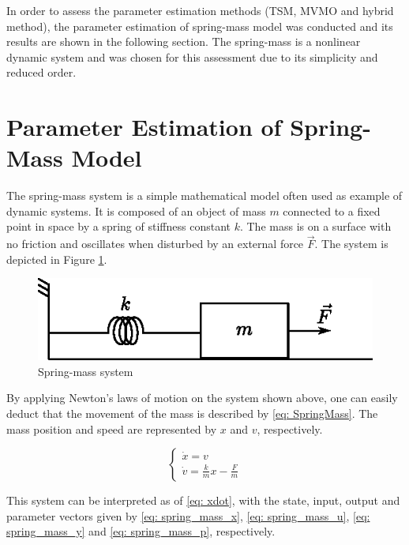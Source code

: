 In order to assess the parameter estimation methods (TSM, MVMO and hybrid method), the parameter estimation of spring-mass model was conducted and its results are shown in the following section. The spring-mass is a nonlinear dynamic system and was chosen for this assessment due to its simplicity and reduced order.

\section{Parameter Estimation of Spring-Mass Model}

The spring-mass system is a simple mathematical model often used as example of dynamic systems. It is composed of an object of mass $m$ connected to a fixed point in space by a spring of stiffness constant $k$. The mass is on a surface with no friction and oscillates when disturbed by an external force $\vec{F}$. The system is depicted in Figure \ref{fig: spring_mass}.

\begin{figure}[h]
	\caption{Spring-mass system}
	\begin{center}
		\includegraphics[scale=1]{Images/spring_mass.eps}
	\end{center}
	\label{fig: spring_mass}
\end{figure}

By applying Newton's laws of motion on the system shown above, one can easily deduct that the movement of the mass is described by \eqref{eq: SpringMass}. The mass position and speed are represented by $x$ and $v$, respectively.

\begin{equation}
	\begin{cases}
		\dot{x} = v \\
		\dot{v} = \frac{k}{m}x - \frac{F}{m}
	\end{cases}
	\label{eq: SpringMass}
\end{equation}

This system can be interpreted as of \eqref{eq: xdot}, with the state, input, output and parameter vectors given by \eqref{eq: spring_mass_x}, \eqref{eq: spring_mass_u}, \eqref{eq: spring_mass_y} and \eqref{eq: spring_mass_p}, respectively.

